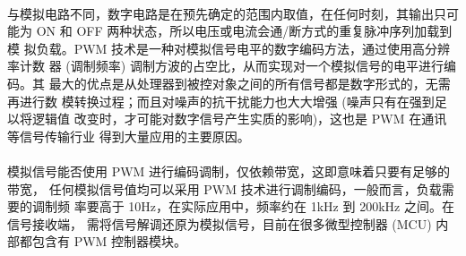 \documentclass[UTF8, oneside]{ctexbook}
\begin{document}
\paragraph{}
与模拟电路不同，数字电路是在预先确定的范围内取值，在任何时刻，其输出只可
能为 ON 和 OFF 两种状态，所以电压或电流会通/断方式的重复脉冲序列加载到模
拟负载。PWM 技术是一种对模拟信号电平的数字编码方法，通过使用高分辨率计数
器 (调制频率) 调制方波的占空比，从而实现对一个模拟信号的电平进行编码。其
最大的优点是从处理器到被控对象之间的所有信号都是数字形式的，无需再进行数
模转换过程；而且对噪声的抗干扰能力也大大增强 (噪声只有在强到足以将逻辑值
改变时，才可能对数字信号产生实质的影响)，这也是 PWM 在通讯等信号传输行业
得到大量应用的主要原因。

\paragraph{}
模拟信号能否使用 PWM 进行编码调制，仅依赖带宽，这即意味着只要有足够的带宽，
任何模拟信号值均可以采用 PWM 技术进行调制编码，一般而言，负载需要的调制频
率要高于 10Hz，在实际应用中，频率约在 1kHz 到 200kHz 之间。在信号接收端，
需将信号解调还原为模拟信号，目前在很多微型控制器 (MCU) 内部都包含有 PWM 
控制器模块。
\end{document}
